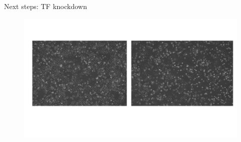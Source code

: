 \documentclass[slidestop,compress,11pt,xcolor=dvipsnames]{beamer}
\begin{document}
\begin{frame}{Next steps: TF knockdown}
\vspace{-0.5cm}
 \begin{figure}[ht!]
  \centering
  \includegraphics[width=1.0\textwidth]{glioma/knockdown_TF_ESCA.pdf}
  \label{Candidate master regulator Transcription Factors (TF) knockdown in the SKGT4 human esophageal adenocarcinoma cell line. Figure produced by Dr. Dechen Li}
 \end{figure}
\end{frame}
\end{document}
